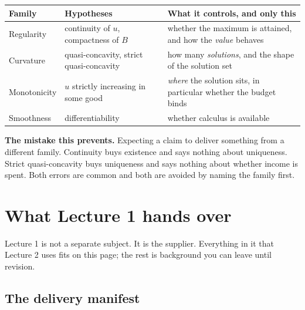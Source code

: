 \documentclass[11pt]{article}
\theoremstyle{definition}
\newenvironment{keybox}{\begin{snugshade}\noindent\ignorespaces}{\end{snugshade}}
\begin{document}
\begin{center}
\begin{tabular}{@{}p{2.9cm}p{4.0cm}p{7.4cm}@{}}
\toprule
\textbf{Family} & \textbf{Hypotheses} & \textbf{What it controls, and only this} \\
\midrule
Regularity & continuity of $u$, compactness of $B$ & whether the maximum is attained, and how the \emph{value} behaves \\[3pt]
Curvature & quasi-concavity, strict quasi-concavity & how many \emph{solutions}, and the shape of the solution set \\[3pt]
Monotonicity & $u$ strictly increasing in some good & \emph{where} the solution sits, in particular whether the budget binds \\[3pt]
Smoothness & differentiability & whether calculus is available \\
\bottomrule
\end{tabular}
\end{center}

\begin{keybox}
\textbf{The mistake this prevents.} Expecting a claim to deliver something from a different
family. Continuity buys existence and says nothing about uniqueness. Strict quasi-concavity
buys uniqueness and says nothing about whether income is spent. Both errors are common and
both are avoided by naming the family first.
\end{keybox}

\clearpage

\section{What Lecture 1 hands over}

Lecture 1 is not a separate subject. It is the supplier. Everything in it that Lecture 2
uses fits on this page; the rest is background you can leave until revision.

\subsection{The delivery manifest}
\end{document}
